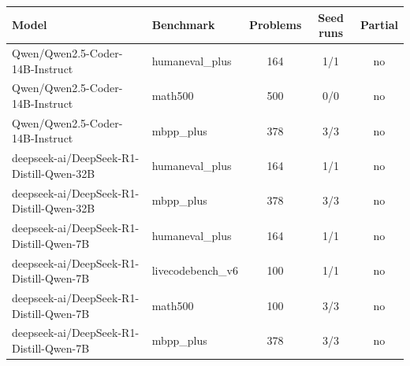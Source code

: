 \begin{tabular}{llccc}
\toprule
Model & Benchmark & Problems & Seed runs & Partial \\
\midrule
Qwen/Qwen2.5-Coder-14B-Instruct & humaneval_plus & 164 & 1/1 & no \\
Qwen/Qwen2.5-Coder-14B-Instruct & math500 & 500 & 0/0 & no \\
Qwen/Qwen2.5-Coder-14B-Instruct & mbpp_plus & 378 & 3/3 & no \\
deepseek-ai/DeepSeek-R1-Distill-Qwen-32B & humaneval_plus & 164 & 1/1 & no \\
deepseek-ai/DeepSeek-R1-Distill-Qwen-32B & mbpp_plus & 378 & 3/3 & no \\
deepseek-ai/DeepSeek-R1-Distill-Qwen-7B & humaneval_plus & 164 & 1/1 & no \\
deepseek-ai/DeepSeek-R1-Distill-Qwen-7B & livecodebench_v6 & 100 & 1/1 & no \\
deepseek-ai/DeepSeek-R1-Distill-Qwen-7B & math500 & 100 & 3/3 & no \\
deepseek-ai/DeepSeek-R1-Distill-Qwen-7B & mbpp_plus & 378 & 3/3 & no \\
\bottomrule
\end{tabular}

